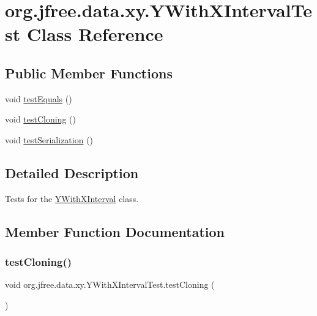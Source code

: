\hypertarget{classorg_1_1jfree_1_1data_1_1xy_1_1_y_with_x_interval_test}{}\section{org.\+jfree.\+data.\+xy.\+Y\+With\+X\+Interval\+Test Class Reference}
\label{classorg_1_1jfree_1_1data_1_1xy_1_1_y_with_x_interval_test}
\subsection*{Public Member Functions}
\begin{DoxyCompactItemize}
\item 
void \mbox{\hyperlink{classorg_1_1jfree_1_1data_1_1xy_1_1_y_with_x_interval_test_ae7280fca6abc2afaffd3f5ba9893d469}{test\+Equals}} ()
\item 
void \mbox{\hyperlink{classorg_1_1jfree_1_1data_1_1xy_1_1_y_with_x_interval_test_a5230f7f896ae3fb3ea1f73873fdd8865}{test\+Cloning}} ()
\item 
void \mbox{\hyperlink{classorg_1_1jfree_1_1data_1_1xy_1_1_y_with_x_interval_test_a9a3f2299d7e65ffb85f00ea7fb827230}{test\+Serialization}} ()
\end{DoxyCompactItemize}


\subsection{Detailed Description}
Tests for the \mbox{\hyperlink{classorg_1_1jfree_1_1data_1_1xy_1_1_y_with_x_interval}{Y\+With\+X\+Interval}} class. 

\subsection{Member Function Documentation}
\mbox{\label{classorg_1_1jfree_1_1data_1_1xy_1_1_y_with_x_interval_test_a5230f7f896ae3fb3ea1f73873fdd8865}} 
\subsubsection{\texorpdfstring{test\+Cloning()}{testCloning()}}
{\footnotesize\ttfamily void org.\+jfree.\+data.\+xy.\+Y\+With\+X\+Interval\+Test.\+test\+Cloning (\begin{DoxyParamCaption}{ }\end{DoxyParamCaption})}

